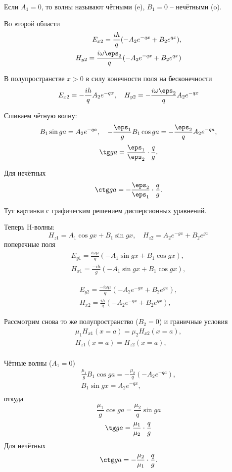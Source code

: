 Если \(A_1 = 0\), то волны называют чётными (e), \( B_1 = 0 \) -- нечётными (o).

Во второй области
\begin{align*}
	E_{x2} = \frac{ih}{q}(-A_2 e^{-qx} + B_2 e^{qx}),\\
	H_{y2} = \frac{i\omega\eps_2}{q}(-A_2 e^{-qx} + B_2 e^{qx})\\
\end{align*}

В полупространстве \( x>0 \) в силу конечности поля на бесконечности
\[
	E_{x2} = -\frac{ih}{q} A_2 e^{-qx},\quad
	H_{y2} = -\frac{i\omega\eps_2}{q} A_2 e^{-qx}
\]

Сшиваем чётную волну:
\[
	B_1\sin ga = A_2e^{-qa},\quad -\frac{\eps_1}{g} B_1\cos ga = -\frac{\eps_2}{q} A_2 e^{-qa},
\]
\[
	\tg ga = \frac{\eps_1}{\eps_2}\cdot\frac{q}{g}.
\]

Для нечётных
\[
	\ctg ga = -\frac{\eps_2}{\eps_1}\cdot\frac{q}{g}.
\]

Тут картинки с графическим решением дисперсионных уравнений.

Теперь H-волны:
\[
	H_{z1} = A_1 \cos gx + B_1 \sin gx,\quad H_{z2} = A_2 e^{-gx} + B_2 e^{gx}
\]
поперечные поля
\begin{align*}
	E_{y1} = \frac{i\omega\mu}{g}(-A_1\sin gx + B_1\cos gx),\\
	H_{x1} = \frac{-ih}{g}(-A_1\sin gx + B_1\cos gx),
\end{align*}

\begin{align*}
	E_{y2} = \frac{-i\omega\mu}{q}(-A_2 e^{-gx} + B_2 e^{gx}),\\
	H_{x2} = \frac{ih}{q}(-A_2 e^{-qx} + B_2 e^{qx}),
\end{align*}

Рассмотрим снова то же полупространство (\( B_2 = 0 \)) и граничные условия
\begin{align*}
	\mu_1H_{x1}(x=a) = \mu_2H_{x2}(x=a),\\
	H_{z1}(x=a) = H_{z2}(x=a),\\
\end{align*}

Чётные волны (\( A_1 = 0 \))
\begin{align*}
	\frac{\mu_1}{g}B_1\cos ga = -\frac{\mu_2}{q}(-A_2 e^{-qa}),\\
	B_1 \sin gx = A_2 e^{-qx},\\
\end{align*}
откуда
\[
	\frac{\mu_1}{g}\cos ga = \frac{\mu_2}{q}\sin ga
\]
\[
	\tg ga = \frac{\mu_1}{\mu_2}\cdot\frac{q}{g}
\]
Для нечётных
\[
	\ctg ga = -\frac{\mu_2}{\mu_1}\cdot\frac{q}{g}.
\]

